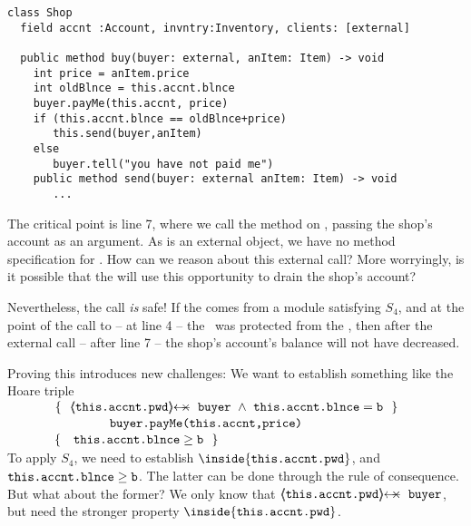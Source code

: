 \begin{lstlisting}
class Shop
  field accnt :Account, invntry:Inventory, clients: [external]    
  
  public method buy(buyer: external, anItem: Item) -> void
    int price = anItem.price
    int oldBlnce = this.accnt.blnce
    buyer.payMe(this.accnt, price)
    if (this.accnt.blnce == oldBlnce+price)
       this.send(buyer,anItem)
    else
       buyer.tell("you have not paid me") 
    public method send(buyer: external anItem: Item) -> void  
       ...            
\end{lstlisting}
 

The critical point is line 7, where we call the method   on , passing the shop's account as an argument.
As  is an external object, we have no method specification for . 
How can we reason about this external call?
More worryingly, is it possible that the  will use this opportunity  to drain the shop's account?
 
 
 \vspace{.1cm}
 {Nevertheless, the call \emph{is} safe!} If the  comes from a module satisfying $S_4$, and  at the point of the call to  -- \ie at line 4 -- the \password~was protected from the , then %
 after the external call -- \ie after line 7 --  the shop's account's balance will not have decreased.
 
 {Proving this introduces new challenges: We want to  establish something like the Hoare triple\\
$\strut \ \ \ \ \ \ \ \ \ \ \  \{\  \ {\protectedFrom {\prg{this.\myAccount.pwd}} {\prg{buyer}}\ \wedge\ {\prg{this.\myAccount.\balance}}=\prg{b}    }\ \  \}$\\
$\strut \ \ \ \ \ \ \ \ \ \ \   \ \ \ \ \ \ \ \ \ \ \ \ {\ \prg{buyer.payMe(this.accnt,price)}   \ } $\\
$\strut \ \ \ \ \ \ \ \ \ \ \  \{\  \ \  {\prg{this.\myAccount.\balance}} \geq  \prg{b} \  \  \}$ 
}
\\
 {%
To apply $S_4$, we need to establish  ${\inside {\prg{this.\myAccount.pwd}}}$, and  $\mbox{\normalfont{\texttt{this.\mbox{\normalfont{\texttt{accnt}}}.\mbox{\normalfont{\texttt{blnce}}}}}}\geq\mbox{\normalfont{\texttt{b}}}$. 
The latter can be done through the rule of consequence. 
But what about the former? 
We only know that $\protectedFrom {\prg{this.\myAccount.pwd}} {\prg{buyer}}$, but   need the stronger property  ${\inside {\prg{this.\myAccount.pwd}}}$.}

